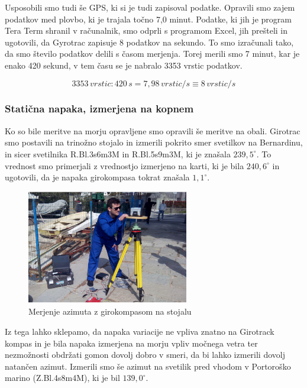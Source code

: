 Usposobili smo tudi še GPS, ki si je tudi zapisoval podatke. Opravili smo zajem podatkov med plovbo, ki je trajala točno 7,0 minut. Podatke, ki jih je program Tera Term shranil v računalnik, smo odprli s programom Excel, jih prešteli in ugotovili, da Gyrotrac zapisuje 8 podatkov na sekundo. To smo izračunali tako, da smo število podatkov delili s časom merjenja. Torej merili smo 7 minut, kar je enako 420 sekund, v tem času se je nabralo 3353 vrstic podatkov.

$$ 3353\,vrstic : 420\,s = 7,98\,vrstic/s \equiv 8\,vrstic/s $$


\subsubsection{Statična napaka, izmerjena na kopnem}
Ko so bile meritve na morju opravljene smo opravili še meritve na obali.  Girotrac smo postavili na trinožno stojalo in izmerili pokrito smer svetilkov na Bernardinu, in sicer svetilnika R.Bl.3s6m3M in R.Bl.5s9m3M, ki je znašala $239,5^{\circ}$. To vrednost smo primerjali z vrednostjo izmerjeno na karti, ki je bila $240,6^{\circ}$ in ugotovili, da je napaka girokompasa tokrat znašala $1,1^{\circ}$. 

\begin{figure}
	\centering
	\includegraphics[height=5cm]{Aleks_Gyro}
	\caption{Merjenje azimuta z girokompasom na stojalu}
	\label{fig:Aleks_meri}       %
\end{figure}


Iz tega lahko sklepamo, da napaka variacije ne vpliva znatno na Girotrack kompas in je bila napaka izmerjena na morju vpliv močnega vetra ter nezmožnosti obdržati gomon dovolj dobro v smeri, da bi lahko izmerili dovolj natančen azimut. Izmerili smo še azimut na svetilik pred vhodom v Portoroško marino (Z.Bl.4s8m4M), ki je bil $139,0^{\circ}$.

